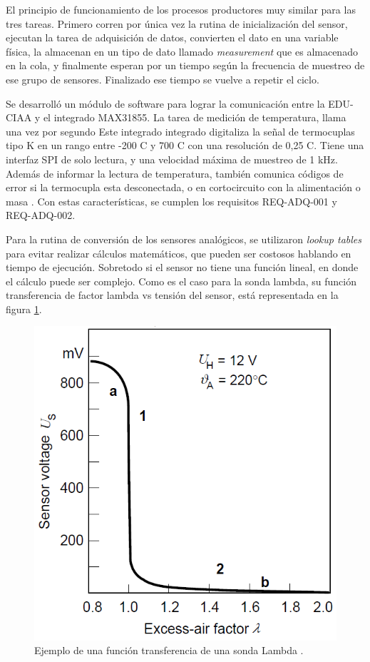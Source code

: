 El principio de funcionamiento de los procesos productores muy similar para las tres tareas. Primero corren por única vez la rutina de inicialización del sensor, ejecutan la tarea de adquisición de datos, convierten el dato en una variable física, la almacenan en un tipo de dato llamado \textit{measurement} que es almacenado en la cola, y finalmente esperan por un tiempo según la frecuencia de muestreo de ese grupo de sensores. Finalizado ese tiempo se vuelve a repetir el ciclo.

Se desarrolló un módulo de software para lograr la comunicación entre la EDU-CIAA y el integrado MAX31855. La tarea de medición de temperatura, llama una vez por segundo Este integrado integrado digitaliza la señal de termocuplas tipo K en un rango entre -200 \degree C y 700 \degree C con una resolución de 0,25 \degree C. Tiene una interfaz SPI de solo lectura, y una velocidad máxima de muestreo de 1 kHz. Además de informar la lectura de temperatura, también comunica códigos de error si la termocupla esta desconectada, o en cortocircuito con la alimentación o masa \cite{MAX31855}. Con estas características, se cumplen los requisitos REQ-ADQ-001 y REQ-ADQ-002.

Para la rutina de conversión de los sensores analógicos, se utilizaron \textit{lookup tables} para evitar realizar cálculos matemáticos, que pueden ser costosos hablando en tiempo de ejecución. Sobretodo si el sensor no tiene una función lineal, en donde el cálculo puede ser complejo. Como es el caso para la sonda lambda, su función transferencia de factor lambda vs tensión del sensor, está representada en la figura \ref{fig:funcion-lambda}.

\begin{figure}[htpb]
\centering
\includegraphics[width=.55\textwidth]{./Figures/funcion-lambda.png}
\caption{Ejemplo de una función transferencia de una sonda Lambda \protect\footnotemark[3].}
\label{fig:funcion-lambda}
\end{figure}

